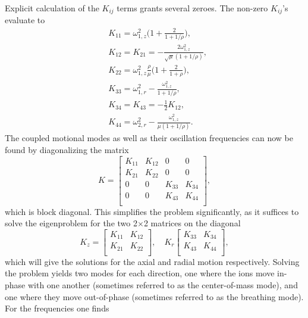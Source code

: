 Explicit calculation of the $K_{ij}$ terms grants several zeroes. The non-zero $K_{ij}$'s evaluate to
\begin{align}
    &K_{11} = \omega_{1,z}^2\bigg(1+\frac{2}{1+1/\rho}\bigg),\\
    &K_{12} = K_ {21} = -\frac{2\omega_{1,z}^2}{\sqrt{\mu}(1+1/\rho)},\\
    &K_{22} = \omega_{1,z}^2\frac{\rho}{\mu}\bigg(1+\frac{2}{1+\rho}\bigg),\\
    &K_{33} = \omega_{1,r}^2 - \frac{\omega_{1,z}^2}{1+1/\rho},\\
    &K_{34} = K_{43} = -\frac{1}{2}K_{12},\\
    &K_{44} = \omega_{2,r}^2-\frac{\omega_{1,z}^2}{\mu(1+1/\rho)}.
\end{align}
The coupled motional modes as well as their oscillation frequencies can now be found by diagonalizing the matrix \cite{Taylor[2005]}
\begin{equation}
    K = \begin{bmatrix}
        K_{11} & K_{12} & 0 & 0\\
        K_{21} & K_{22} & 0 & 0\\
        0 & 0 & K_{33} & K_{34}\\
        0 & 0 & K_{43} & K_{44}\\
    \end{bmatrix},
\end{equation}
which is block diagonal. This simplifies the problem significantly, as it suffices to solve the eigenproblem for the two 2$\times$2 matrices on the diagonal
\begin{equation}
    K_{z} = \begin{bmatrix}
        K_{11} & K_{12}\\
        K_{21} & K_{22}\\
    \end{bmatrix},
    \quad
    K_{r}
    \begin{bmatrix}
        K_{33} & K_{34}\\
        K_{43} & K_{44}\\
    \end{bmatrix},
\end{equation}
which will give the solutions for the axial and radial motion respectively.
Solving the problem yields two modes for each direction, one where the ions move in-phase with one another (sometimes referred to as the center-of-mass mode), and one where they move out-of-phase (sometimes referred to as the breathing mode).
For the frequencies one finds
